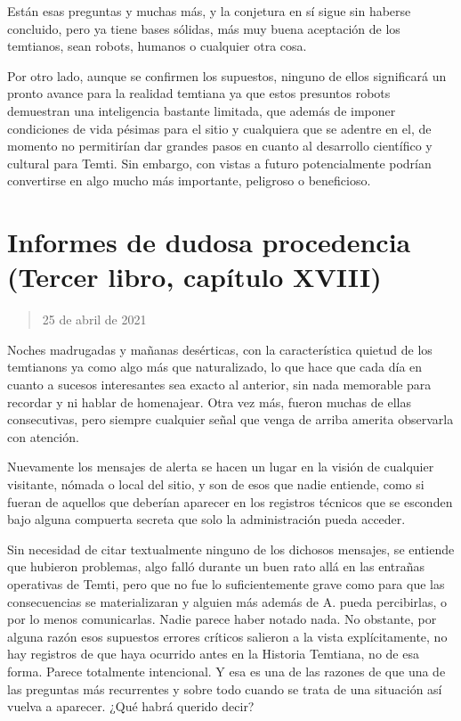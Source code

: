 \documentclass[
  spanish,
]{book}
\begin{document}
Están esas preguntas y muchas más, y la conjetura en sí sigue sin haberse concluido, pero ya tiene bases sólidas, más muy buena aceptación de los temtianos, sean robots, humanos o cualquier otra cosa.

Por otro lado, aunque se confirmen los supuestos, ninguno de ellos significará un pronto avance para la realidad temtiana ya que estos presuntos robots demuestran una inteligencia bastante limitada, que además de imponer condiciones de vida pésimas para el sitio y cualquiera que se adentre en el, de momento no permitirían dar grandes pasos en cuanto al desarrollo científico y cultural para Temti. Sin embargo, con vistas a futuro potencialmente podrían convertirse en algo mucho más importante, peligroso o beneficioso.

\hypertarget{informes-de-dudosa-procedencia-tercer-libro-capuxedtulo-xviii}{%
\section{Informes de dudosa procedencia (Tercer libro, capítulo XVIII)}\label{informes-de-dudosa-procedencia-tercer-libro-capuxedtulo-xviii}}

\begin{quote}
25 de abril de 2021
\end{quote}

Noches madrugadas y mañanas desérticas, con la característica quietud de los temtianons ya como algo más que naturalizado, lo que hace que cada día en cuanto a sucesos interesantes sea exacto al anterior, sin nada memorable para recordar y ni hablar de homenajear. Otra vez más, fueron muchas de ellas consecutivas, pero siempre cualquier señal que venga de arriba amerita observarla con atención.

Nuevamente los mensajes de alerta se hacen un lugar en la visión de cualquier visitante, nómada o local del sitio, y son de esos que nadie entiende, como si fueran de aquellos que deberían aparecer en los registros técnicos que se esconden bajo alguna compuerta secreta que solo la administración pueda acceder.

Sin necesidad de citar textualmente ninguno de los dichosos mensajes, se entiende que hubieron problemas, algo falló durante un buen rato allá en las entrañas operativas de Temti, pero que no fue lo suficientemente grave como para que las consecuencias se materializaran y alguien más además de A. pueda percibirlas, o por lo menos comunicarlas. Nadie parece haber notado nada. No obstante, por alguna razón esos supuestos errores críticos salieron a la vista explícitamente, no hay registros de que haya ocurrido antes en la Historia Temtiana, no de esa forma. Parece totalmente intencional. Y esa es una de las razones de que una de las preguntas más recurrentes y sobre todo cuando se trata de una situación así vuelva a aparecer. ¿Qué habrá querido decir?
\end{document}
